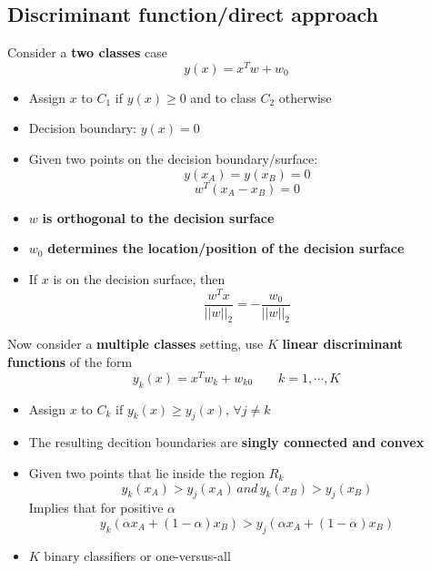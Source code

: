 \subsection{Discriminant function/direct approach}
    Consider a \textbf{two classes} case
    $$y(x)=x^Tw+w_0$$
    \begin{itemize}
        \item Assign $x$ to $C_1$ if $y(x)\geq 0$ and to class $C_2$ otherwise
        \item Decision boundary: $y(x)=0$
        \item Given two points on the decision boundary/surface:
        $$y(x_A)=y(x_B)=0$$
        $$w^T(x_A-x_B)=0$$
        \item $w$ \textbf{is orthogonal to the decision surface}
        \item $w_0$ \textbf{determines the location/position of the decision surface}
        \item If $x$ is on the decision surface, then
        $$\frac{w^Tx}{||w||_2}=-\frac{w_0}{||w||_2}$$
    \end{itemize}
    Now consider a \textbf{multiple classes} setting, use $K$ \textbf{linear discriminant functions} of the form
    $$y_k(x)=x^Tw_k+w_{k0}\hspace{2em}k=1,\cdots,K$$
    \begin{itemize}
        \item Assign $x$ to $C_k$ if $y_k(x)\geq y_j(x),\,\forall j\neq k$
        \item The resulting decition boundaries are \textbf{singly connected and convex}
        \item Given two points that lie inside the region $R_k$
        $$y_k(x_A)>y_j(x_A)\,and\,y_k(x_B)>y_j(x_B)$$
        Implies that for positive $\alpha$
        $$y_k(\alpha x_A+(1-\alpha)x_B)>y_j(\alpha x_A+(1-\alpha)x_B)$$
        \item $K$ binary classifiers or one-versus-all
    \end{itemize}
